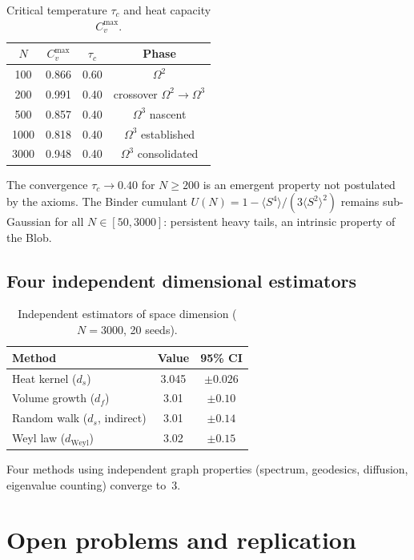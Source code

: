 \documentclass[11pt, a4paper]{article}
\begin{document}
\begin{table}[ht]
\centering
\caption{Critical temperature $\tau_c$ and heat capacity $C_v^{\max}$.}
\begin{tabular}{cccc}
\toprule
$N$ & $C_v^{\max}$ & $\tau_c$ & Phase \\
\midrule
100  & 0.866 & 0.60 & $\Omega^2$ \\
200  & 0.991 & 0.40 & crossover $\Omega^2\to\Omega^3$ \\
500  & 0.857 & 0.40 & $\Omega^3$ nascent \\
1000 & 0.818 & 0.40 & $\Omega^3$ established \\
3000 & 0.948 & 0.40 & $\Omega^3$ consolidated \\
\bottomrule
\end{tabular}
\end{table}

The convergence $\tau_c\to0.40$ for $N\ge200$ is an emergent property
not postulated by the axioms.
The Binder cumulant $U(N)=1-\langle S^4\rangle/(3\langle S^2\rangle^2)$
remains sub-Gaussian for all $N\in[50,3000]$:
persistent heavy tails, an intrinsic property of the Blob.

\subsection{Four independent dimensional estimators}
\begin{table}[ht]
\centering
\caption{Independent estimators of space dimension ($N=3000$, 20 seeds).}
\begin{tabular}{lcc}
\toprule
Method & Value & 95\% CI \\
\midrule
Heat kernel ($d_s$)            & 3.045 & $\pm0.026$ \\
Volume growth ($d_f$)          & 3.01  & $\pm0.10$  \\
Random walk ($d_s$, indirect)  & 3.01  & $\pm0.14$  \\
Weyl law ($d_{\mathrm{Weyl}}$) & 3.02  & $\pm0.15$  \\
\bottomrule
\end{tabular}
\end{table}

Four methods using independent graph properties (spectrum, geodesics,
diffusion, eigenvalue counting) converge to~3.

\section{Open problems and replication}
\end{document}
